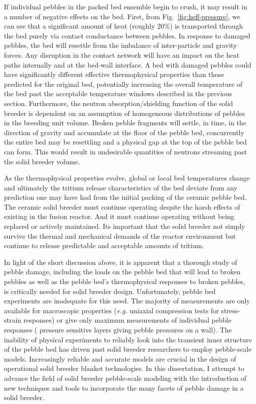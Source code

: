 If individual pebbles in the packed bed ensemble begin to crush, it may result in a number of negative effects on the bed. First, from Fig.~\ref{fig:keff-pressure}, we can see that a significant amount of heat (roughly 20\%) is transported through the bed purely via contact conductance between pebbles. In response to damaged pebbles, the bed will resettle from the imbalance of inter-particle and gravity forces. Any disruption in the contact network will have an impact on the heat paths internally and at the bed-wall interface. A bed with damaged pebbles could have significantly different effective thermophysical properties than those predicted for the original bed, potentially increasing the overall temperature of the bed past the acceptable temperature windows described in the previous section. Furthermore, the neutron absorption/shielding function of the solid breeder is dependent on an assumption of homogeneous distributions of pebbles in the breeding unit volume. Broken pebble fragments will settle, in time, in the direction of gravity and accumulate at the floor of the pebble bed, concurrently the entire bed may be resettling and a physical gap at the top of the pebble bed can form. This would result in undesirable quantities of neutrons streaming past the solid breeder volume. 

As the thermophysical properties evolve, global or local bed temperatures change and ultimately the tritium release characteristics of the bed deviate from any prediction one may have had from the initial packing of the ceramic pebble bed. The ceramic solid breeder must continue operating despite the harsh effects of existing in the fusion reactor. And it must continue operating without being replaced or actively maintained. Its important that the solid breeder not simply survive the thermal and mechanical demands of the reactor environment but continue to release predictable and acceptable amounts of tritium. 

In light of the short discussion above, it is apparent that a thorough study of pebble damage, including the loads on the pebble bed that will lead to broken pebbles as well as the pebble bed's thermophysical responses to broken pebbles, is critically needed for solid breeder design. Unfortunately, pebble bed experiments are inadequate for this need. The majority of measurements are only available for macroscopic properties (\textit{e.g.} uniaxial compression tests for stress-strain responses) or give only maximum measurements of individual pebble responses ( pressure sensitive layers giving pebble pressures on a wall). The inability of physical experiments to reliably look into the transient inner structure of the pebble bed has driven past solid breeder researchers to employ pebble-scale models. Increasingly reliable and accurate models are crucial in the design of operational solid breeder blanket technologies. In this dissertation, I attempt to advance the field of solid breeder pebble-scale modeling with the introduction of new techniques and tools to incorporate the many facets of pebble damage in a solid breeder.

